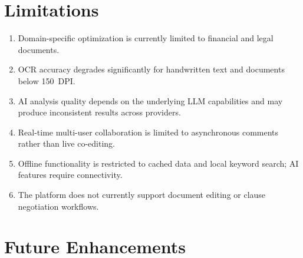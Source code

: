 \documentclass[12pt,a4paper,oneside]{report}
\begin{document}
\section{Limitations}

\begin{enumerate}[leftmargin=2cm]
  \item Domain-specific optimization is currently limited to financial and legal documents.
  \item OCR accuracy degrades significantly for handwritten text and documents below 150~DPI.
  \item AI analysis quality depends on the underlying LLM capabilities and may produce inconsistent results across providers.
  \item Real-time multi-user collaboration is limited to asynchronous comments rather than live co-editing.
  \item Offline functionality is restricted to cached data and local keyword search; AI features require connectivity.
  \item The platform does not currently support document editing or clause negotiation workflows.
\end{enumerate}

\section{Future Enhancements}
\end{document}
